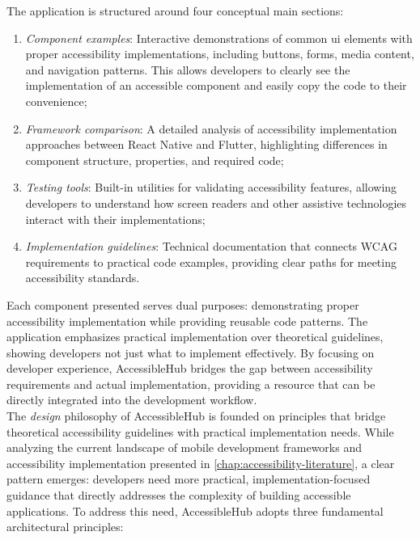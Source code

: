 The application is structured around four conceptual main sections:
\begin{enumerate}
    \item \textit{Component examples}: Interactive demonstrations of common \acrshort{ui} elements with proper accessibility implementations, including buttons, forms, media content, and navigation patterns. This allows developers to clearly see the implementation of an accessible component and easily copy the code to their convenience;
    
    \item \textit{Framework comparison}: A detailed analysis of accessibility implementation approaches between React Native and Flutter, highlighting differences in component structure, properties, and required code;
    
    \item \textit{Testing tools}: Built-in utilities for validating accessibility features, allowing developers to understand how screen readers and other assistive technologies interact with their implementations;
    
    \item \textit{Implementation guidelines}: Technical documentation that connects WCAG requirements to practical code examples, providing clear paths for meeting accessibility standards.
\end{enumerate}

Each component presented serves dual purposes: demonstrating proper accessibility implementation while providing reusable code patterns. The application emphasizes practical implementation over theoretical guidelines, showing developers not just what to implement effectively. By focusing on developer experience, AccessibleHub bridges the gap between accessibility requirements and actual implementation, providing a resource that can be directly integrated into the development workflow. \\

The \textit{design} philosophy of AccessibleHub is founded on principles that bridge theoretical accessibility guidelines with practical implementation needs. While analyzing the current landscape of mobile development frameworks and accessibility implementation presented in \ref{chap:accessibility-literature}, a clear pattern emerges: developers need more practical, implementation-focused guidance that directly addresses the complexity of building accessible applications. To address this need, AccessibleHub adopts three fundamental architectural principles:

